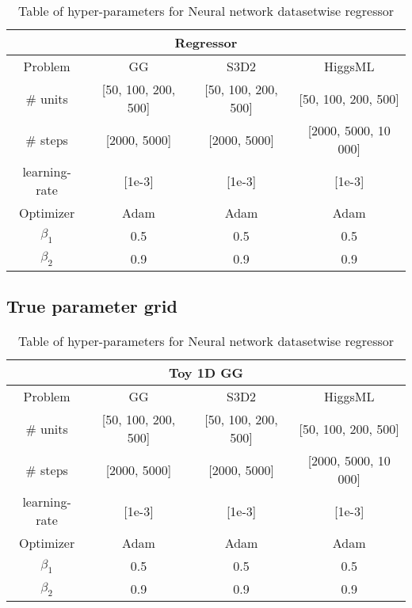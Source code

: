 \begin{table}[ht!]
\centering
\begin{tabular}{||c c c c||} 
 \hline
 \multicolumn{4}{|c|}{Regressor}\\
 \hline
 Problem & GG & S3D2 & HiggsML \\ [0.5ex] 
 \hline
 \# units & [50, 100, 200, 500] & [50, 100, 200, 500] & [50, 100, 200, 500] \\ 
 \# steps & [2000, 5000] & [2000, 5000] & [2000, 5000, 10 000] \\
 learning-rate & [1e-3] & [1e-3] & [1e-3] \\
 Optimizer & Adam & Adam & Adam \\
 $\beta_1$ & 0.5 & 0.5 & 0.5 \\
 $\beta_2$ & 0.9 & 0.9 & 0.9 \\
 \hline
\end{tabular}
\caption{Table of hyper-parameters for Neural network datasetwise regressor}
\label{table:HP_REG}
\end{table}





\subsection{True parameter grid} %
\label{sub:true_parameter_grid}


\begin{table}[ht!]
\centering
\begin{tabular}{||c c c c||} 
 \hline
 \multicolumn{4}{|c|}{Toy 1D GG}\\
 \hline
 Problem & GG & S3D2 & HiggsML \\ [0.5ex] 
 \hline
 \# units & [50, 100, 200, 500] & [50, 100, 200, 500] & [50, 100, 200, 500] \\ 
 \# steps & [2000, 5000] & [2000, 5000] & [2000, 5000, 10 000] \\
 learning-rate & [1e-3] & [1e-3] & [1e-3] \\
 Optimizer & Adam & Adam & Adam \\
 $\beta_1$ & 0.5 & 0.5 & 0.5 \\
 $\beta_2$ & 0.9 & 0.9 & 0.9 \\
 \hline
\end{tabular}
\caption{Table of hyper-parameters for Neural network datasetwise regressor}
\label{table:HP_REG}
\end{table}





